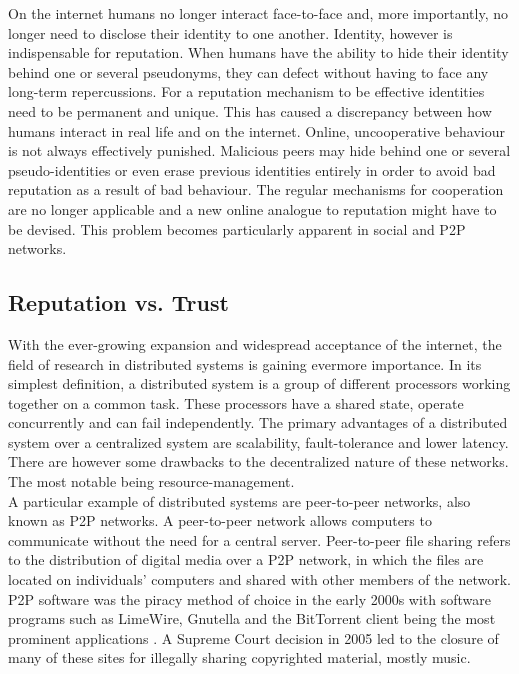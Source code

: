 \documentclass[11pt,a4paper]{article}
\theoremstyle{definition}
\theoremstyle{theorem}
\theoremstyle{proposition}
\theoremstyle{corollary}
\theoremstyle{lemma}
\theoremstyle{example}
\theoremstyle{remark}
\begin{document}
\noindent{}On the internet humans no longer interact face-to-face and, more importantly, no longer need to disclose their identity to one another. Identity, however is indispensable for reputation. When humans have the ability to hide their identity behind one or several pseudonyms, they can defect without having to face any long-term repercussions. For a reputation mechanism to be effective identities need to be permanent and unique. This has caused a discrepancy between how humans interact in real life and on the internet. Online, uncooperative behaviour is not always effectively punished. Malicious peers may hide behind one or several pseudo-identities or even erase previous identities entirely in order to avoid bad reputation as a result of bad behaviour. The regular mechanisms for cooperation are no longer applicable and a new online analogue to reputation might have to be devised. This problem becomes particularly apparent in social and P2P networks.\vspace{1em}\\

\subsection{Reputation vs. Trust}
\label{subsec:Reputation vs. Trust}

\noindent{}With the ever-growing expansion and widespread acceptance of the internet, the field of research in distributed systems is gaining evermore importance. In its simplest definition, a distributed system is a group of different processors working together on a common task. These processors have a shared state, operate concurrently and can fail independently. The primary advantages of a distributed system over a centralized system are scalability, fault-tolerance and lower latency. There are however some drawbacks to the decentralized nature of these networks. The most notable being resource-management.\vspace{1em}\\

\noindent{}A particular example of distributed systems are peer-to-peer networks, also known as P2P networks. A peer-to-peer network allows computers to communicate without the need for a central server. Peer-to-peer file sharing refers to the distribution of digital media over a P2P network, in which the files are located on individuals' computers and shared with other members of the network. P2P software was the piracy method of choice in the early 2000s with software programs such as LimeWire, Gnutella and the BitTorrent client being the most prominent applications \cite{The Early Days of Mass Internet Piracy Were Awesome Yet Awful}. A Supreme Court decision in 2005 led to the closure of many of these sites for illegally sharing copyrighted material, mostly music.\vspace{1em}\\
\end{document}
